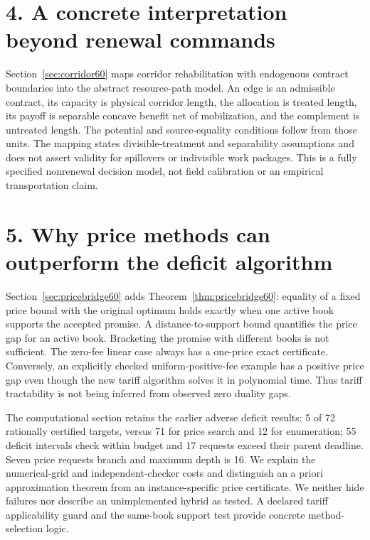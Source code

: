 \section*{4. A concrete interpretation beyond renewal commands}
Section~\ref{sec:corridor60} maps corridor rehabilitation with endogenous contract boundaries into the abstract resource-path model. An edge is an admissible contract, its capacity is physical corridor length, the allocation is treated length, its payoff is separable concave benefit net of mobilization, and the complement is untreated length. The potential and source-equality conditions follow from those units. The mapping states divisible-treatment and separability assumptions and does not assert validity for spillovers or indivisible work packages. This is a fully specified nonrenewal decision model, not field calibration or an empirical transportation claim.

\section*{5. Why price methods can outperform the deficit algorithm}
Section~\ref{sec:pricebridge60} adds Theorem~\ref{thm:pricebridge60}: equality of a fixed price bound with the original optimum holds exactly when one active book supports the accepted promise. A distance-to-support bound quantifies the price gap for an active book. Bracketing the promise with different books is not sufficient. The zero-fee linear case always has a one-price exact certificate. Conversely, an explicitly checked uniform-positive-fee example has a positive price gap even though the new tariff algorithm solves it in polynomial time. Thus tariff tractability is not being inferred from observed zero duality gaps.

The computational section retains the earlier adverse deficit results: 5 of 72 rationally certified targets, versus 71 for price search and 12 for enumeration; 55 deficit intervals check within budget and 17 requests exceed their parent deadline. Seven price requests branch and maximum depth is 16. We explain the numerical-grid and independent-checker costs and distinguish an a priori approximation theorem from an instance-specific price certificate. We neither hide failures nor describe an unimplemented hybrid as tested. A declared tariff applicability guard and the same-book support test provide concrete method-selection logic.

